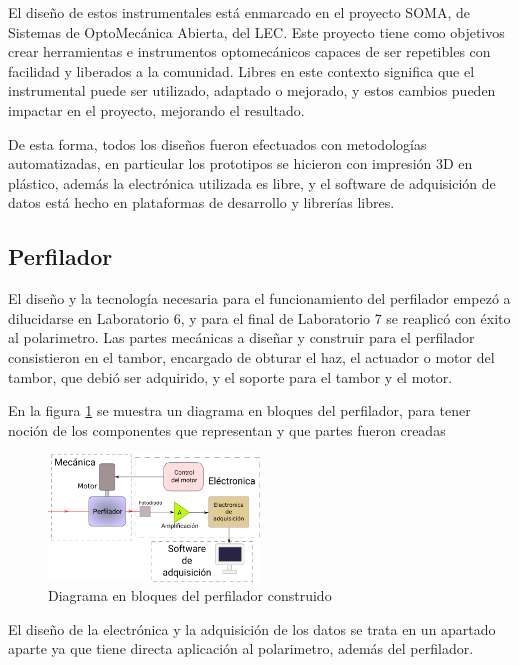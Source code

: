 
El diseño de estos instrumentales está enmarcado en el proyecto SOMA\cite{soma}, de Sistemas de OptoMecánica Abierta, del LEC. Este proyecto tiene como objetivos crear herramientas e instrumentos optomecánicos capaces de ser repetibles con facilidad y liberados a la comunidad. Libres en este contexto significa que el instrumental puede ser utilizado, adaptado o mejorado, y estos cambios pueden impactar en el proyecto, mejorando el resultado.

De esta forma, todos los diseños fueron efectuados con metodologías automatizadas, en particular los prototipos se hicieron con impresión 3D en plástico, además la electrónica utilizada es libre, y el software de adquisición de datos está hecho en plataformas de desarrollo y librerías libres.

\subsection{Perfilador}

El diseño y la tecnología necesaria para el funcionamiento del perfilador empezó a dilucidarse en Laboratorio 6, y para el final de Laboratorio 7 se reaplicó con éxito al polarimetro. Las partes mecánicas a diseñar y construir para el perfilador consistieron en el tambor, encargado de obturar el haz, el actuador o motor del tambor, que debió ser adquirido, y el soporte para el tambor y el motor.

En la figura \ref{fig:perfilador/esquema_bloques} se muestra un diagrama en bloques del perfilador, para tener noción de los componentes que representan y que partes fueron creadas

\begin{figure}[H]
    \centering
    \includegraphics[width=0.5\textwidth]{fig/perfilador/esquema_bloques}
    \caption{Diagrama en bloques del perfilador construido}
    \label{fig:perfilador/esquema_bloques}
\end{figure}

El diseño de la electrónica y la adquisición de los datos se trata en un apartado aparte ya que tiene directa aplicación al polarimetro, además del perfilador.

